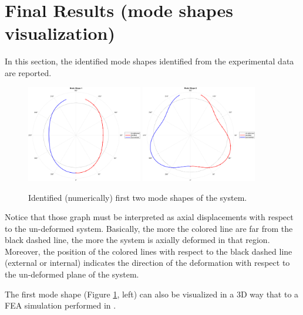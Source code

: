 \section{Final Results (mode shapes visualization)}
\label{sec:final_results_B}

In this section, the identified mode shapes identified from the experimental data are reported.

\begin{figure}[H]
    \centering
    \includegraphics[width=0.45\textwidth]{img/MATLAB/Part_B/ModeShape_01.png}
    \hfill
    \includegraphics[width=0.45\textwidth]{img/MATLAB/Part_B/ModeShape_02.png}
    \caption{Identified (numerically) first two mode shapes of the system.}
    \label{fig:mode_shapes}
\end{figure}

Notice that those graph must be interpreted as axial displacements with respect to the un-deformed system.
Basically, the more the colored line are far from the black dashed line, the more the system is axially deformed in that region.
Moreover, the position of the colored lines with respect to the black dashed line (external or internal) indicates the direction of the deformation with respect to the un-deformed plane of the system.

The first mode shape (Figure \ref{fig:mode_shapes}, left) can also be visualized in a 3D way that to a FEA simulation performed in \cite{FEM_rail_wheel}.

